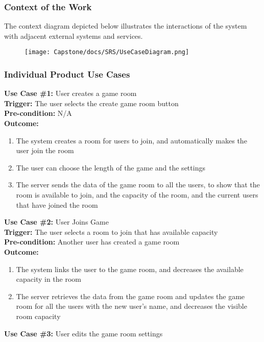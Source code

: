 \documentclass[12pt]{article}
\begin{document}
\subsubsection{Context of the Work}
The context diagram depicted below illustrates the interactions of the system with adjacent
external systems and services.
\begin{figure}[htbp]
\centerline{\texttt{[image: Capstone/docs/SRS/UseCaseDiagram.png]}}
\label{UseCaseDiagram}
\end{figure}

\newpage
\subsubsection{Individual Product Use Cases}

\textbf{Use Case \#1:} User creates a game room\\
\textbf{Trigger:} The user selects the create game room button\\
\textbf{Pre-condition:} N/A\\
\textbf{Outcome:}
\begin{enumerate}
	\item The system creates a room for users to join, and automatically makes the user join the room
    \item The user can choose the length of the game and the settings
	\item The server sends the data of the game room to all the users, to show that the room is available to join, and the capacity of the room, and the current users that have joined the room
\end{enumerate}
\textbf{Use Case \#2:} User Joins Game\\
\textbf{Trigger:} The user selects a room to join that has available capacity\\
\textbf{Pre-condition:} Another user has created a game room\\
\textbf{Outcome:}
\begin{enumerate}
	\item The system links the user to the game room, and decreases the available capacity in the room
    \item The server retrieves the data from the game room and updates the game room for all the users with the new user's name, and decreases the visible room capacity
\end{enumerate}
\textbf{Use Case \#3:} User edits the game room settings\\
\end{document}
